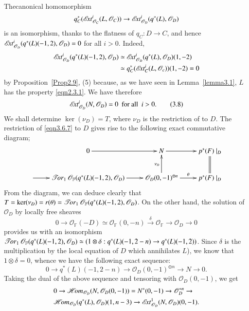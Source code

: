 The\pageoriginale canonical homomorphism
$$
q_C^{\ast}(\mathscr{E}\!{\it xt}^{i}_{\mathscr{O}_C}(L,\mathscr{O}_C))\to
\mathscr{E}\!{\it xt}^{i}_{\mathscr{O}_{D}}(q^{\ast}(L),\mathscr{O}_D)
$$ 
is an
isomorphism, thanks to the flatness of $q_C:D\to C$, and hence
$\mathscr{E}\!{\it xt}^{i}_{\mathscr{O}_D}(q^{\ast}(L)(-1,2),\mathscr{O}_{D})=0$ for all
$i>0$. Indeed,
\begin{align*}
\mathscr{E}\!{\it xt}^{i}_{\mathscr{O}_{D}}(q^{\ast}(L)(-1,2),\mathscr{O}_D) &\simeq
\mathscr{E}\!{\it xt}^{i}_{\mathscr{O}_{D}}(q^{\ast}(L), \mathscr{O}_D)(1,-2)\\
&\simeq
q_C^{*}(\mathscr{E}\!{\it xt}^{i}_C(L,\mathscr{O}_c))(1,-2)=0
\end{align*}
by Proposition~\ref{Prop2.9},
(5) because, as we have seen in Lemma~\ref{lemma3.1}, $L$ has the
property \eqref{eqn2.3.1}. We have therefore 
\begin{equation}
\mathscr{E}\!{\it xt}^{i}_{\mathscr{O}_D}(N,\mathscr{O}_D)=0\text{~ for all~ } i>0.\tag{3.8}\label{eqn3.6.8}
\end{equation}
We shall determine $\ker(\nu_D)=T$, where $\nu_D$ is the restriction
of to $D$. The restriction of \ref{eqn3.6.7} to $D$ gives rise to the
following exact commutative diagram; 
\begin{equation*}
\xymatrix{& 0\ar[r]&N\ar[r]&p^{\ast}(F)\mid_D\\
\ar[r]&\Tor_1\mathscr{O}_{\mathbb{F}}(q^{\ast}(L)(-1,2),\mathscr{O}_D)\ar[r]&\mathscr{O}_D(0,-1)^{\oplus
  n}\ar[u]^{\nu_D}\ar[r]^-{\theta} & p^{\ast}(F)\mid_D\ar@{=}[u]}
\end{equation*}
From the diagram, we can deduce clearly that
$T=\ker(\nu_D)=r(\theta)=\operatorname{\mathscr{T}\!{\it or}}_1\mathscr{O}_{\mathbb{F}}(q^{\ast}(L)(-1,2),\mathscr{O}_D)$. On the other hand, the solution of $\mathscr{O}_D$ by locally free
sheaves 
$$
0\to \mathscr{O}_{\mathbb{F}}(-D)\simeq
\mathscr{O}_{\mathbb{F}}(0,-n)\xrightarrow{\delta}\mathscr{O}_{\mathbb{F}}\to
\mathscr{O}_D\to 0
$$
provides us with an isomorphism $\operatorname{\mathscr{T}\!{\it or}}_{1}\mathscr{O}_{\mathbb{F}}(q^{\ast}(L)(-1,2),\mathscr{O}_D)\simeq 
  (1\otimes \delta:q^{\ast}(L)(-1,2-n)\to q^{\ast}(L)(-1,2))$. Since
  $\delta$ is the multiplication by the local equation of $D$ which
  annihilates $L$), we know that $1\otimes \delta=0$, whence we have
  the following exact sequence: 
\begin{equation}
0\to q^{\ast}(L)(-1,2-n)\to \mathscr{O}_D(0,-1)^{\oplus n}\to N \to 0.\tag{3.9}
\label{eqn3.6.9}
\end{equation}
\pageoriginale
Taking the dual of the above sequence and tensoring with
$\mathscr{O}_D(0,-1)$, we get 
$$
\begin{aligned}
&0\to \mathscr{H}\!{\it om}_{\mathscr{O}_D}(N,\mathscr{O}_D(0,-1))=N^{\ast}(0,-1)\to
\mathscr{O}^{\ast n}_{D}\to\\
&\mathscr{H}\!{\it om}_{\mathscr{O}_D}(q^{\ast}(L),\mathscr{O}_D)(1,n-3)\to \mathscr{E}\!{\it xt}^{1}_{\mathscr{O}_D}(N,\mathscr{O}_D)(0,-1).
\end{aligned}
$$

